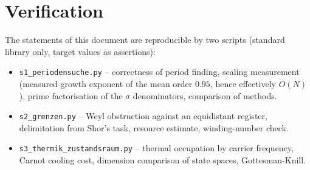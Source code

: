 \section{Verification}

The statements of this document are reproducible by two scripts (standard
library only, target values as assertions):

\begin{itemize}
  \item \texttt{s1\_periodensuche.py} -- correctness of period finding,
    scaling measurement (measured growth exponent of the mean order $0.95$,
    hence effectively $O(N)$), prime factorisation of the $\sigma$
    denominators, comparison of methods.
  \item \texttt{s2\_grenzen.py} -- Weyl obstruction against an equidistant
    register, delimitation from Shor's task, resource estimate, winding-number
    check.
  \item \texttt{s3\_thermik\_zustandsraum.py} -- thermal occupation by carrier
    frequency, Carnot cooling cost, dimension comparison of state spaces,
    Gottesman-Knill.
\end{itemize}
